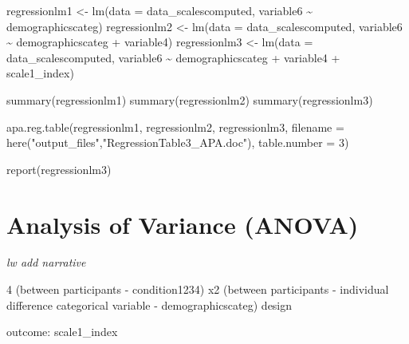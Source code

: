 \documentclass[
  letterpaper,
  DIV=11,
  numbers=noendperiod]{scrreprt}
\newenvironment{Shaded}{\begin{snugshade}}{\end{snugshade}}
\newcommand{\AttributeTok}[1]{\textcolor[rgb]{0.40,0.45,0.13}{#1}}
\newcommand{\DecValTok}[1]{\textcolor[rgb]{0.68,0.00,0.00}{#1}}
\newcommand{\FunctionTok}[1]{\textcolor[rgb]{0.28,0.35,0.67}{#1}}
\newcommand{\NormalTok}[1]{\textcolor[rgb]{0.00,0.23,0.31}{#1}}
\newcommand{\OtherTok}[1]{\textcolor[rgb]{0.00,0.23,0.31}{#1}}
\newcommand{\SpecialCharTok}[1]{\textcolor[rgb]{0.37,0.37,0.37}{#1}}
\newcommand{\StringTok}[1]{\textcolor[rgb]{0.13,0.47,0.30}{#1}}
\begin{document}
\begin{Shaded}
\begin{Highlighting}[]
\NormalTok{regressionlm1 }\OtherTok{\textless{}{-}} \FunctionTok{lm}\NormalTok{(}\AttributeTok{data =}\NormalTok{ data\_scalescomputed, variable6 }\SpecialCharTok{\textasciitilde{}}\NormalTok{ demographicscateg)}
\NormalTok{regressionlm2 }\OtherTok{\textless{}{-}} \FunctionTok{lm}\NormalTok{(}\AttributeTok{data =}\NormalTok{ data\_scalescomputed, variable6 }\SpecialCharTok{\textasciitilde{}}\NormalTok{ demographicscateg }\SpecialCharTok{+}\NormalTok{ variable4)}
\NormalTok{regressionlm3 }\OtherTok{\textless{}{-}} \FunctionTok{lm}\NormalTok{(}\AttributeTok{data =}\NormalTok{ data\_scalescomputed, variable6 }\SpecialCharTok{\textasciitilde{}}\NormalTok{ demographicscateg }\SpecialCharTok{+}\NormalTok{ variable4 }\SpecialCharTok{+}\NormalTok{ scale1\_index)}

\FunctionTok{summary}\NormalTok{(regressionlm1)}
\FunctionTok{summary}\NormalTok{(regressionlm2)}
\FunctionTok{summary}\NormalTok{(regressionlm3)}


\FunctionTok{apa.reg.table}\NormalTok{(regressionlm1, regressionlm2, regressionlm3, }\AttributeTok{filename =} \FunctionTok{here}\NormalTok{(}\StringTok{"output\_files"}\NormalTok{,}\StringTok{"RegressionTable3\_APA.doc"}\NormalTok{), }\AttributeTok{table.number =} \DecValTok{3}\NormalTok{)}

\FunctionTok{report}\NormalTok{(regressionlm3)}
\end{Highlighting}
\end{Shaded}


\chapter{Analysis of Variance (ANOVA)}\label{analysis-of-variance-anova}

\emph{lw add narrative}

4 (between participants - condition1234) x2 (between participants -
individual difference categorical variable - demographicscateg) design

outcome: scale1\_index
\end{document}
